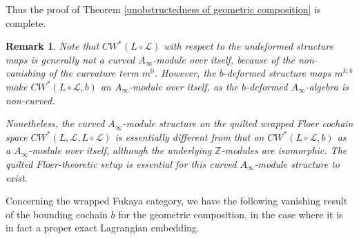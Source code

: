 \documentclass{amsart}
\newtheorem{remark}[theorem]{Remark}
\numberwithin{equation}{section}
\numberwithin{figure}{section}
\begin{document}
	Thus the proof of Theorem \ref{unobstructedness of geometric composition} is complete. \par

\begin{remark}
	Note that $CW^{*}(L \circ \mathcal{L})$ with respect to the undeformed structure maps is generally not a curved $A_{\infty}$-module over itself, because of the non-vanishing of the curvature term $m^{0}$. However, the $b$-deformed structure maps $m^{k; b}$ make $CW^{*}(L \circ \mathcal{L}, b)$ an $A_{\infty}$-module over itself, as the $b$-deformed $A_{\infty}$-algebra is non-curved. \par
	Nonetheless, the curved $A_{\infty}$-module structure on the quilted wrapped Floer cochain space $CW^{*}(L, \mathcal{L}, L \circ \mathcal{L})$ is essentially different from that on $CW^{*}(L \circ \mathcal{L}, b)$ as a $A_{\infty}$-module over itself, although the underlying $\mathbb{Z}$-modules are isomorphic. The quilted Floer-theoretic setup is essential for this curved $A_{\infty}$-module structure to exist. \par
\end{remark}

	Concerning the wrapped Fukaya category, we have the following vanishing result of the bounding cochain $b$ for the geometric composition, in the case where it is in fact a proper exact Lagrangian embedding. \par
\end{document}
